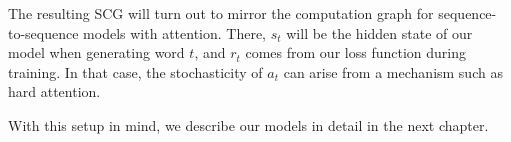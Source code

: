 \documentclass[12pt]{report}
\begin{document}
The resulting SCG will turn out to mirror the computation graph for sequence-to-sequence models with attention. There, $s_t$ will be the hidden state of our model when generating word $t$, and $r_t$ comes from our loss function during training. In that case, the stochasticity of $a_t$ can arise from a mechanism such as hard attention.


With this setup in mind, we describe our models in detail in the next chapter.

%
%

%
%
\end{document}
